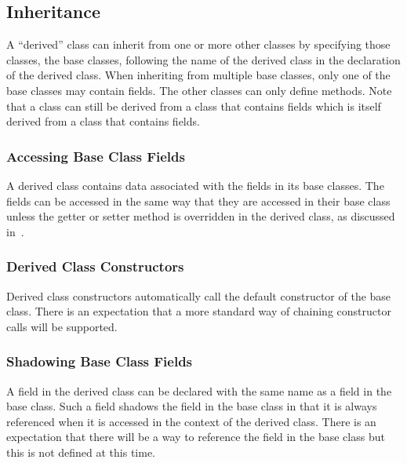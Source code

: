 \subsection{Inheritance}
\label{Inheritance}

A ``derived'' class can inherit from one or more other classes by
specifying those classes, the base classes, following the name of the
derived class in the declaration of the derived class.  When
inheriting from multiple base classes, only one of the base classes
may contain fields.  The other classes can only define methods.  Note
that a class can still be derived from a class that contains fields
which is itself derived from a class that contains fields.

\subsubsection{Accessing Base Class Fields}
\label{Accessing_Base_Class_Fields}

A derived class contains data associated with the fields in its base
classes.  The fields can be accessed in the same way that they are
accessed in their base class unless the getter or setter method is
overridden in the derived class, as discussed
in~.

\subsubsection{Derived Class Constructors}
\label{Derived_Class_Constructors}

Derived class constructors automatically call the default constructor
of the base class.  There is an expectation that a more standard way
of chaining constructor calls will be supported.

\subsubsection{Shadowing Base Class Fields}
\label{Shadowing_Base_Class_Fields}

A field in the derived class can be declared with the same name as a
field in the base class.  Such a field shadows the field in the base
class in that it is always referenced when it is accessed in the
context of the derived class.  There is an expectation that there will
be a way to reference the field in the base class but this is not
defined at this time.

